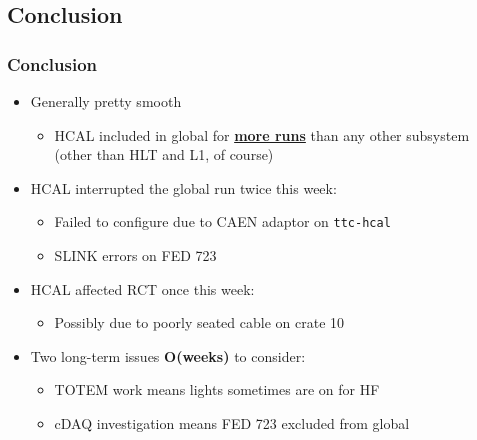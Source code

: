 \documentclass[bigger]{beamer}
\providecommand{\alert}[1]{\textbf{#1}}
\begin{document}
\subsection{Conclusion}
\label{sec-4-1}
\begin{frame}
\frametitle{Conclusion}
\label{sec-4-1-1}
\begin{itemize}

\item Generally pretty smooth
\label{sec-4-1-1-1}%
\begin{itemize}

\item HCAL included in global for \href{https://hypernews.cern.ch/HyperNews/CMS/get/commissioning/5208.html}{\alert{more runs}} than any other subsystem (other than HLT and L1, of course)
\label{sec-4-1-1-1-1}%
\end{itemize} %

\item HCAL interrupted the global run twice this week:
\label{sec-4-1-1-2}%
\begin{itemize}

\item Failed to configure due to CAEN adaptor on \texttt{ttc-hcal}
\label{sec-4-1-1-2-1}%

\item SLINK errors on FED 723
\label{sec-4-1-1-2-2}%
\end{itemize} %

\item HCAL affected RCT once this week:
\label{sec-4-1-1-3}%
\begin{itemize}

\item Possibly due to poorly seated cable on crate 10
\label{sec-4-1-1-3-1}%
\end{itemize} %

\item Two long-term issues \alert{O(weeks)} to consider:
\label{sec-4-1-1-4}%
\begin{itemize}

\item TOTEM work means lights sometimes are on for HF
\label{sec-4-1-1-4-1}%

\item cDAQ investigation means FED 723 excluded from global
\label{sec-4-1-1-4-2}%
\end{itemize} %
\end{itemize} %
\end{frame}
\end{document}
